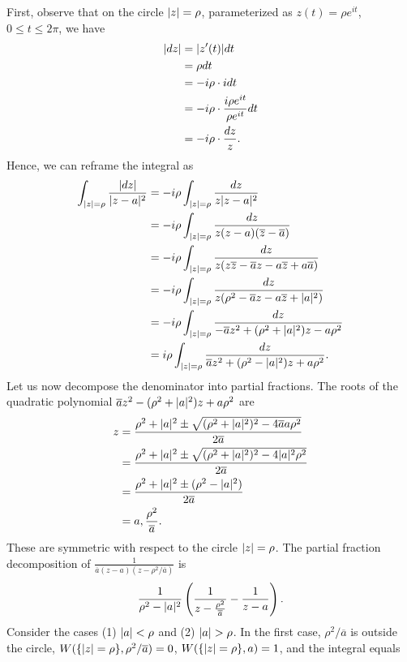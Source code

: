 \begin{exercise}
\begin{sol}
\begin{enumerate}
First, observe that on the circle $\lvert z \rvert=\rho$, parameterized as $z(t)=\rho e^{it}$, $0 \le t \le 2\pi$, we have
\begin{align*}
\lvert dz \rvert &=\lvert z'(t) \rvert dt \\
&=\rho dt \\
&=-i\rho \cdot i dt \\
&=-i \rho \cdot \dfrac{i \rho e^{it}}{\rho e^{it}}dt \\
&=-i \rho \cdot \dfrac{dz}{z}.
\end{align*}
Hence, we can reframe the integral as
\begin{align*}
\int_{\lvert z \rvert=\rho}\dfrac{\lvert dz \rvert}{\lvert z-a \rvert^2} &= -i \rho\int_{\lvert z \rvert=\rho}\dfrac{dz}{z\lvert z-a \rvert^2} \\
&=-i\rho \int_{\lvert z \rvert=\rho}\dfrac{dz}{z(z-a)(\overline{z}-\overline{a})} \\
&=-i\rho \int_{\lvert z \rvert=\rho}\dfrac{dz}{z(z\overline{z}-\overline{a}z-a\overline{z}+a\overline{a})} \\
&=-i\rho \int_{\lvert z \rvert=\rho}\dfrac{dz}{z(\rho^2-\overline{a}z-a\overline{z}+\lvert a \rvert^2)} \\
&=-i\rho \int_{\lvert z \rvert=\rho}\dfrac{dz}{-\overline{a}z^2+(\rho^2+\lvert a \rvert^2)z-a\rho^2} \\
&=i\rho \int_{\lvert z \rvert=\rho}\dfrac{dz}{\overline{a}z^2+(\rho^2-\lvert a \rvert^2)z+a\rho^2}.
\end{align*}
Let us now decompose the denominator into partial fractions. The roots of the quadratic polynomial $\overline{a}z^2-(\rho^2+\lvert a \rvert^2)z+a\rho^2$ are
\begin{align*}
z &=\dfrac{\rho^2+\lvert a \rvert^2 \pm \sqrt{(\rho^2+\lvert a \rvert^2)^2-4\overline{a}a\rho^2}}{2\overline{a}} \\
&=\dfrac{\rho^2+\lvert a \rvert^2 \pm \sqrt{(\rho^2+\lvert a \rvert^2)^2-4\lvert a \rvert^2\rho^2}}{2\overline{a}} \\
&=\dfrac{\rho^2+\lvert a \rvert^2 \pm (\rho^2-\lvert a \rvert^2)}{2\overline{a}} \\
&=a, \dfrac{\rho^2}{\overline{a}}.
\end{align*}
These are symmetric with respect to the circle $\lvert z \rvert=\rho$. The partial fraction decomposition of $\frac{1}{\overline{a}\left(z-a\right)\left(z-\rho^2/\overline{a}\right)}$ is $$\dfrac{1}{\rho^2-\lvert a \rvert^2}\left(\dfrac{1}{z-\frac{\rho^2}{\overline{a}}}-\dfrac{1}{z-a}\right).$$ Consider the cases (1) $\lvert a \rvert<\rho$ and (2) $\lvert a \rvert>\rho$. In the first case, $\rho^2/\overline{a}$ is outside the circle, $W(\{\lvert z \rvert=\rho\},\rho^2/\overline{a})=0$, $W(\{\lvert z \rvert=\rho\},a)=1$, and the integral equals

\end{enumerate}
\end{sol}
\end{exercise}
